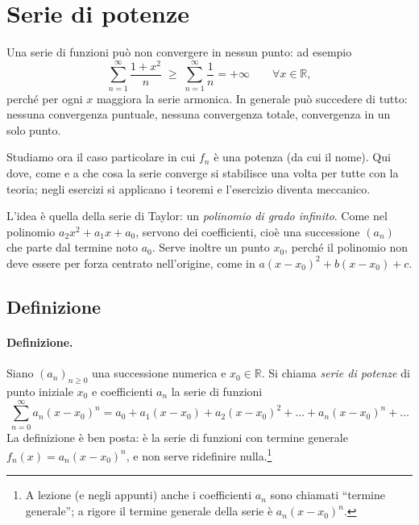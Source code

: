 
\section{Serie di potenze}

Una serie di funzioni può non convergere in nessun punto: ad esempio
\[
  \sum_{n=1}^{\infty}\frac{1+x^2}{n}\;\ge\;\sum_{n=1}^{\infty}\frac{1}{n}=+\infty
  \qquad\forall x\in\mathbb{R},
\]
perché per ogni $x$ maggiora la serie armonica. In generale può succedere di
tutto: nessuna convergenza puntuale, nessuna convergenza totale, convergenza in
un solo punto.

Studiamo ora il caso particolare in cui $f_n$ è una potenza (da cui il nome).
Qui dove, come e a che cosa la serie converge si stabilisce una volta per tutte
con la teoria; negli esercizi si applicano i teoremi e l'esercizio diventa
meccanico.

L'idea è quella della serie di Taylor: un \emph{polinomio di grado infinito}.
Come nel polinomio $a_2x^2+a_1x+a_0$, servono dei coefficienti, cioè una
successione $(a_n)$ che parte dal termine noto $a_0$.
Serve inoltre un punto $x_0$, perché il polinomio non deve essere per forza
centrato nell'origine, come in $a(x-x_0)^2+b(x-x_0)+c$.

\subsection{Definizione}

\paragraph{Definizione.} Siano $(a_n)_{n\ge0}$ una successione numerica e
$x_0\in\mathbb{R}$. Si chiama \emph{serie di potenze} di punto iniziale $x_0$ e
coefficienti $a_n$ la serie di funzioni
\[
  \sum_{n=0}^{\infty} a_n (x-x_0)^n = a_0 + a_1(x-x_0) + a_2(x-x_0)^2 + \dots + a_n(x-x_0)^n + \dots
\]
La definizione è ben posta: è la serie di funzioni con termine generale
$f_n(x)=a_n(x-x_0)^n$, e non serve ridefinire nulla.\footnote{A lezione (e negli
appunti) anche i coefficienti $a_n$ sono chiamati ``termine generale''; a rigore
il termine generale della serie è $a_n(x-x_0)^n$.}

